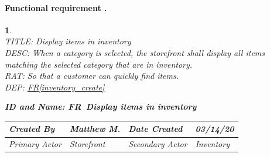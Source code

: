 \documentclass{scrreprt}
\theoremstyle{funreq}
\newtheorem{funreq}{}
\newcommand*{\reqref}[1]{\hyperref[#1]{FR\ref*{#1}}}
\begin{document}
\paragraph[]{Functional requirement .}
\begin{funreq}
	\label{store_listcategory}
	~\\
	TITLE: Display items in inventory\\
	DESC: When a category is selected, the storefront shall display all items matching the selected category that are in inventory.\\
	RAT: So that a customer can quickly find items.\\
	DEP: \reqref{inventory_create}\\
	

	\begin{table}[htb!]
		\begin{flushleft}\bfseries{ID and Name: FR\thefunreq ~\hspace{.6cm}Display items in inventory}\normalfont\end{flushleft}
		\begin{tabularx}{\columnwidth}{|X|X|X|X|}
			\hline
			Created By    & Matthew M. & Date Created    & 03/14/20 \\ \hline
			Primary Actor & Storefront        & Secondary Actor & Inventory \\ \hline
		\end{tabularx}
		

\end{table}
\end{funreq}
\end{document}
